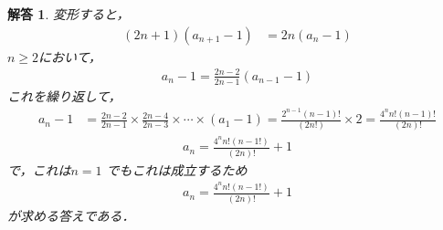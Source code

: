 \documentclass[dvipdfmx]{jsarticle}
\newtheorem*{answer*}{解答}
\begin{document}
\begin{answer*}
  変形すると，
  \begin{align*}
    (2n+1)(a_{n+1}-1) &= 2n(a_{n}-1)
  \end{align*}
  $n \geq 2$において，
  \begin{align*}
    a_{n}-1=\frac{2n-2}{2n-1}(a_{n-1}-1)
  \end{align*}
  これを繰り返して，
  \begin{align*}
    a_{n}-1&=\frac{2n-2}{2n-1}\times \frac{2n-4}{2n-3}\times \cdots \times (a_{1}-1)
    =\frac{2^{n-1}(n-1)!}{(2n!)}\times 2
    =\frac{4^nn!(n-1)!}{(2n)!}
  \end{align*}
  \begin{align*}
    a_{n}=\frac{4^nn!(n-1!)}{(2n)!}+1
  \end{align*}
  で，これは$n=1$ でもこれは成立するため
  \begin{align*}
    a_{n}=\frac{4^nn!(n-1!)}{(2n)!}+1
  \end{align*}
  が求める答えである．

\end{answer*}
\end{document}
